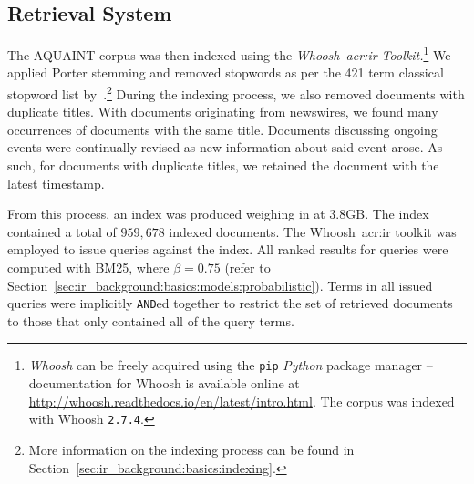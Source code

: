 \begin{figure}[h]
    \centering
    \vspace{6mm}
    \vspace{-9mm}
    \label{fig:aquaint_stats}
\end{figure}

\subsection{Retrieval System}\label{sec:methodology:collection:system}
The AQUAINT corpus was then indexed using the \emph{Whoosh~\gls{acr:ir} Toolkit.}\footnote{\emph{Whoosh} can be freely acquired using the \texttt{pip} \emph{Python} package manager -- documentation for Whoosh is available online at \url{http://whoosh.readthedocs.io/en/latest/intro.html}.  The corpus was indexed with Whoosh \texttt{2.7.4}.} We applied Porter stemming and removed stopwords as per the 421 term classical stopword list by~\cite{fox1992stopwords}.\footnote{More information on the indexing process can be found in Section~\ref{sec:ir_background:basics:indexing}.} During the indexing process, we also removed documents with duplicate titles. With documents originating from newswires, we found many occurrences of documents with the same title. Documents discussing ongoing events were continually revised as new information about said event arose. As such, for documents with duplicate titles, we retained the document with the latest timestamp.

From this process, an index was produced weighing in at $3.8$GB. The index contained a total of $959,678$ indexed documents. The Whoosh~\gls{acr:ir} toolkit was employed to issue queries against the index. All ranked results for queries were computed with BM25, where $\beta=0.75$ (refer to Section~\ref{sec:ir_background:basics:models:probabilistic}). Terms in all issued queries were implicitly \texttt{AND}ed together to restrict the set of retrieved documents to those that only contained all of the query terms.

